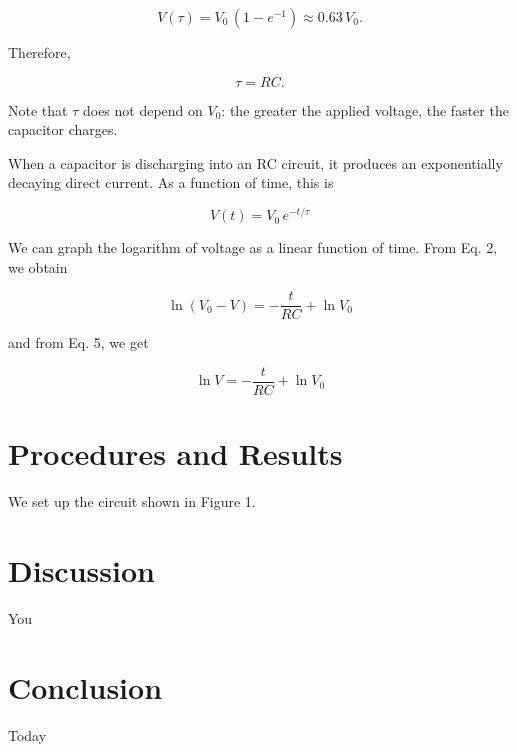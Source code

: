 \documentclass[11pt, titlepage, letterpaper, twoside]{article}
\begin{document}
\begin{equation}
V(\tau) = V_0\,(1 - e^{-1}) \approx 0.63\,V_0.
\end{equation}

Therefore,

\begin{equation}
  \tau = RC.
\end{equation}

Note that $\tau$ does not depend on $V_0$: the greater the applied voltage, the faster the capacitor charges.

When a capacitor is discharging into an RC circuit, it produces an exponentially decaying direct current. As a function of time,
this is

\begin{equation}
  V(t) = V_0\, e^{-t/\tau}
\end{equation}

We can graph the logarithm of voltage as a linear function of time. From Eq. 2, we obtain

\begin{equation}
  \ln(V_0 - V) = -\frac{t}{RC} + \ln V_0
\end{equation}

and from Eq. 5, we get

\begin{equation}
  \ln V = -\frac{t}{RC} + \ln V_0
\end{equation}

\section{Procedures and Results}
We set up the circuit shown in Figure 1.

\section{Discussion}
You

\section{Conclusion}
Today
\end{document}
